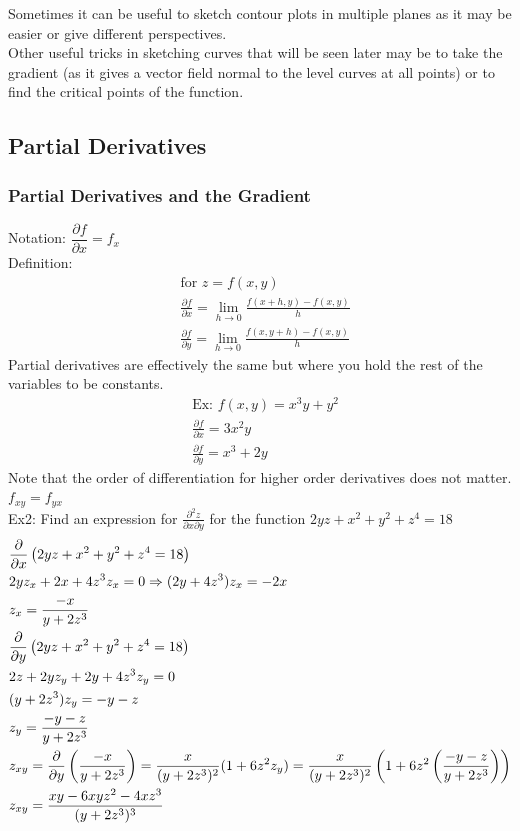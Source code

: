 \documentclass[11pt, fleqn]{article}
\begin{document}
Sometimes it can be useful to sketch contour plots in multiple planes as it may be easier or give different perspectives.\\
Other useful tricks in sketching curves that will be seen later may be to take the gradient (as it gives a vector field normal to the level curves at all points) or to find the critical points of the function.












\subsection{Partial Derivatives}

\subsubsection{Partial Derivatives and the Gradient}
Notation: $\dfrac{\partial f}{\partial x}=f_x$\\
Definition:
\begin{align*}
    &\text{for }z=f(x,y)\\
    &\frac{\partial f}{\partial x}=\lim_{h\to 0}\frac{f(x+h,y)-f(x,y)}{h}\\
    &\frac{\partial f}{\partial y}=\lim_{h\to 0}\frac{f(x,y+h)-f(x,y)}{h}
\end{align*}
Partial derivatives are effectively the same but where you hold the rest of the variables to be constants.
\begin{align*}
    &\text{Ex: }f(x,y)=x^3y+y^2\\
    &\frac{\partial f}{\partial x}=3x^2y\\
    &\frac{\partial f}{\partial y}=x^3+2y
\end{align*}
Note that the order of differentiation for higher order derivatives does not matter. $f_{xy}=f_{yx}$\\
Ex2: Find an expression for $\frac{\partial^2 z}{\partial x\partial y}$ for the function $2yz+x^2+y^2+z^4=18$
\begin{align*}
    &\frac{\partial}{\partial x}\left( 2yz+x^2+y^2+z^4=18 \right)\\
    &2yz_x+2x+4z^3z_x=0\Rightarrow (2y+4z^3)z_x=-2x\\
    &z_x=\frac{-x}{y+2z^3}\\
    &\frac{\partial }{\partial y}\left( 2yz+x^2+y^2+z^4=18 \right)\\
    &2z+2yz_y+2y+4z^3z_y=0\\
    &(y+2z^3)z_y=-y-z\\
    &z_y=\frac{-y-z}{y+2z^3}\\
    &z_{xy}=\frac{\partial}{\partial y}\left( \frac{-x}{y+2z^3} \right)=\frac{x}{(y+2z^3)^2}(1+6z^2z_y)=\frac{x}{(y+2z^3)^2}\left( 1+6z^2\left( \frac{-y-z}{y+2z^3} \right) \right)\\
    &z_{xy}=\frac{xy-6xyz^2-4xz^3}{(y+2z^3)^3}
\end{align*}
\end{document}
